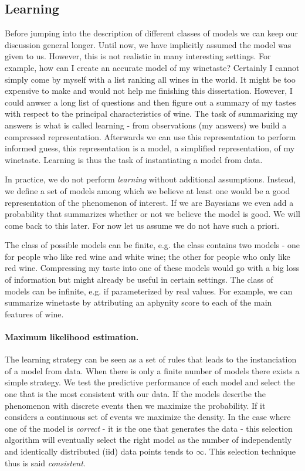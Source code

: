 \subsection{Learning}
Before jumping into the description of different classes of models we can keep our discussion general longer.
Until now, we have implicitly assumed the model was given to us. However, this is not realistic in many interesting settings. For example, how can I create an accurate model of my winetaste? Certainly I cannot simply come by myself with a list ranking all wines in the world. It might be too expensive to make and would not help me finishing this dissertation. However, I could anwser a long list of questions and then figure out a summary of my tastes with respect to the principal characteristics of wine. The task of summarizing my answers is what is called learning - from observations (my answers) we build a compressed representation. Afterwards we can use this representation to perform informed guess, this representation is a model, a simplified representation, of my winetaste. Learning is thus the task of instantiating a model from data.

In practice, we do not perform \textit{learning} without additional assumptions. Instead, we define a set of models among which we believe at least one would be a good representation of the phenomenon of interest. If we are Bayesians we even add a probability that summarizes whether or not we believe the model is good. We will come back to this later. For now let us assume we do not have such a priori.

The class of possible models can be finite, e.g. the class contains two models - one for people who like red wine and white wine; the other for people who only like red wine. Compressing my taste into one of these models would go with a big loss of information but might already be useful in certain settings. The class of models can be infinite, e.g. if parameterized by real values. For example, we can summarize winetaste by attributing an aphynity score to each of the main features of wine.
\paragraph{Maximum likelihood estimation.}
The learning strategy can be seen as a set of rules that leads to the instanciation of a model from data. When there is only a finite number of models there exists a simple strategy. We test the predictive performance of each model and select the one that is the most consistent with our data. If the models describe the phenomenon with discrete events then we maximize the probability. If it considers a continuous set of events we maximize the density. In the case where one of the model is \textit{correct} - it is the one that generates the data - this selection algorithm will eventually select the right model as the number of independently and identically distributed (iid) data points tends to $\infty$. This selection technique thus is said \textit{consistent}.


